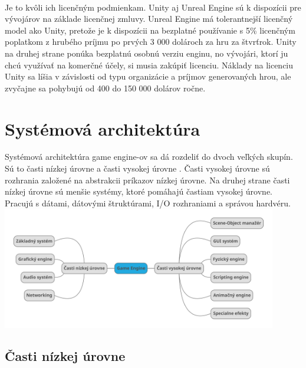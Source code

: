 \documentclass[10pt,oneside,slovak,a4paper,hidelinks]{article}
\begin{document}
		\paragraph{}Je to kvôli ich licenčným podmienkam. Unity aj Unreal Engine sú k dispozícii pre vývojárov na základe licenčnej zmluvy. Unreal Engine má tolerantnejší licenčný model ako Unity, pretože je k dispozícii na bezplatné používanie s 5\% licenčným poplatkom z hrubého príjmu po prvých 3 000 dolároch za hru za štvrťrok. Unity na druhej strane ponúka bezplatnú osobnú verziu enginu, no vývojári, ktorí ju chcú využívať na komerčné účely, si musia zakúpiť licenciu. Náklady na licenciu Unity sa líšia v závislosti od typu organizácie a príjmov generovaných hrou, ale zvyčajne sa pohybujú od 400 do 150 000 dolárov ročne.
	\section{Systémová architektúra}
		Systémová architektúra game engine-ov sa dá rozdeliť do dvoch veľkých skupín. Sú to časti nízkej úrovne a časti vysokej úrovne \cite{Primary}. Časti vysokej úrovne sú rozhrania založené na abstrakcii príkazov nízkej úrovne. Na druhej strane časti nízkej úrovne sú menšie systémy, ktoré pomáhajú častiam vysokej úrovne. Pracujú s dátami, dátovými štruktúrami, I/O rozhraniami a správou hardvéru.
		\includegraphics[width=12cm]{sys_arch}
	\subsection{Časti nízkej úrovne}
\end{document}
